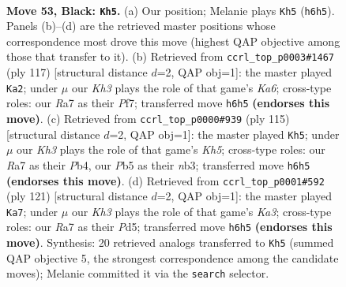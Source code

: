 \documentclass[11pt]{article}
\begin{document}
\clearpage

\begin{figure}[p]\centering
\begin{subfigure}{0.46\textwidth}\centering
\resizebox{\linewidth}{!}{%
\newchessgame
\chessboard[
  setfen={8/r7/7k/1p3K2/8/8/8/8 b - - 1 53},
  showmover=false,
  pgfstyle=straightmove, color=movearrow, markmove={h6-h5}
]}
\caption{}
\end{subfigure}\hfill
\begin{subfigure}{0.46\textwidth}\centering
\resizebox{\linewidth}{!}{%
\newchessgame
\chessboard[
  setfen={8/5p2/8/8/8/k7/2K5/8 b - - 3 59},
  showmover=false,
  pgfstyle=straightmove, color=movearrow, markmove={a3-a2}
]}
\caption{}
\end{subfigure}
\\[4pt]
\begin{subfigure}{0.46\textwidth}\centering
\resizebox{\linewidth}{!}{%
\newchessgame
\chessboard[
  setfen={8/8/8/5K2/1p5k/1N6/8/8 b - - 1 58},
  showmover=false,
  pgfstyle=straightmove, color=movearrow, markmove={h4-h5}
]}
\caption{}
\end{subfigure}\hfill
\begin{subfigure}{0.46\textwidth}\centering
\resizebox{\linewidth}{!}{%
\newchessgame
\chessboard[
  setfen={8/8/k7/3p4/1K6/8/8/8 b - - 1 61},
  showmover=false,
  pgfstyle=straightmove, color=movearrow, markmove={a6-a7}
]}
\caption{}
\end{subfigure}
\caption{\textbf{Move 53, Black: \texttt{Kh5}.} (a) Our position; Melanie plays \texttt{Kh5} (\texttt{h6h5}). Panels (b)--(d) are the retrieved master positions whose correspondence most drove this move (highest QAP objective among those that transfer to it). (b) Retrieved from \texttt{ccrl\_top\_p0003\#1467} (ply 117) [structural distance $d$=2, QAP obj=1]: the master played \texttt{Ka2}; under $\mu$ our \emph{Kh3} plays the role of that game's \emph{Ka6}; cross-type roles: our \emph{R}a7 as their \emph{P}f7; transferred move \texttt{h6h5} \textbf{(endorses this move)}. (c) Retrieved from \texttt{ccrl\_top\_p0000\#939} (ply 115) [structural distance $d$=2, QAP obj=1]: the master played \texttt{Kh5}; under $\mu$ our \emph{Kh3} plays the role of that game's \emph{Kh5}; cross-type roles: our \emph{R}a7 as their \emph{P}b4, our \emph{P}b5 as their \emph{n}b3; transferred move \texttt{h6h5} \textbf{(endorses this move)}. (d) Retrieved from \texttt{ccrl\_top\_p0001\#592} (ply 121) [structural distance $d$=2, QAP obj=1]: the master played \texttt{Ka7}; under $\mu$ our \emph{Kh3} plays the role of that game's \emph{Ka3}; cross-type roles: our \emph{R}a7 as their \emph{P}d5; transferred move \texttt{h6h5} \textbf{(endorses this move)}. Synthesis: 20 retrieved analogs transferred to \texttt{Kh5} (summed QAP objective 5, the strongest correspondence among the candidate moves); Melanie committed it via the \texttt{search} selector.}
\label{fig:thought-m105}
\end{figure}
\end{document}
